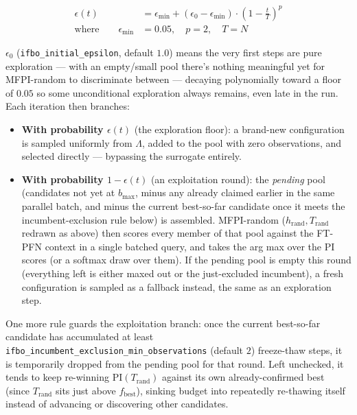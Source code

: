 \documentclass[10pt]{article}
\begin{document}
\begin{align}
\epsilon(t) &= \epsilon_{\min} + (\epsilon_0 - \epsilon_{\min}) \cdot \left(1 - \frac{t}{T}\right)^p \\
\text{where} \qquad \epsilon_{\min} &= 0.05, \quad p = 2, \quad T = N \nonumber
\end{align}

$\epsilon_0$ (\texttt{ifbo\_initial\_epsilon}, default $1.0$) means the very first steps are pure
exploration --- with an empty/small pool there's nothing meaningful yet for MFPI-random to
discriminate between --- decaying polynomially toward a floor of $0.05$ so some unconditional
exploration always remains, even late in the run. Each iteration then branches:

\begin{itemize}
    \item \textbf{With probability $\epsilon(t)$} (the exploration floor): a brand-new configuration is
    sampled uniformly from $\Lambda$, added to the pool with zero observations, and selected
    directly --- bypassing the surrogate entirely.
    \item \textbf{With probability $1-\epsilon(t)$} (an exploitation round): the \emph{pending} pool (candidates
    not yet at $b_{\max}$, minus any already claimed earlier in the same parallel batch, and
    minus the current best-so-far candidate once it meets the incumbent-exclusion rule below)
    is assembled. MFPI-random ($h_\text{rand}, T_\text{rand}$
    redrawn as above) then scores every member of that pool against the
    FT-PFN context in a single batched query, and takes the arg max over the PI scores (or a
    softmax draw over them). If the pending pool is empty this round (everything left is either
    maxed out or the just-excluded incumbent), a fresh configuration is sampled as a fallback
    instead, the same as an exploration step.
\end{itemize}

One more rule guards the exploitation branch: once the current best-so-far candidate has
accumulated at least \texttt{ifbo\_incumbent\_exclusion\_min\_observations} (default $2$) freeze-thaw
steps, it is temporarily dropped from the pending pool for that round. Left unchecked, it tends
to keep re-winning $\mathrm{PI}(T_\text{rand})$ against its own already-confirmed best (since
$T_\text{rand}$ sits just above $f_\text{best}$), sinking budget into repeatedly re-thawing
itself instead of advancing or discovering other candidates.
\end{document}
